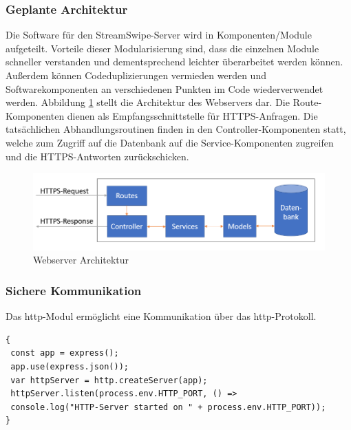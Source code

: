 \subsubsection{Geplante Architektur}
Die Software für den StreamSwipe-Server wird in Komponenten/Module aufgeteilt. Vorteile dieser Modularisierung sind, dass die einzelnen Module schneller verstanden und dementsprechend leichter überarbeitet werden können. Außerdem können Codeduplizierungen vermieden werden und Softwarekomponenten an verschiedenen Punkten im Code wiederverwendet werden. Abbildung \ref{fig:WebserverArchitektur} stellt die Architektur des Webservers dar. Die Route-Komponenten dienen als Empfangsschnittstelle für HTTPS-Anfragen. Die tatsächlichen Abhandlungsroutinen finden in den Controller-Komponenten statt, welche zum Zugriff auf die Datenbank auf die Service-Komponenten zugreifen und die HTTPS-Antworten zurückschicken.
\begin{figure}[tbt]
\centering

\includegraphics[width=13cm]{images/backendstruktur.PNG}
\caption{Webserver Architektur}
\label{fig:WebserverArchitektur}
\end{figure}

\subsubsection{Sichere Kommunikation}
\label{sec:SichereKommunikation}
Das http-Modul ermöglicht eine Kommunikation über das http-Protokoll.\\
 
\begin{lstlisting}[caption=Einfache Verbindung, label=lst:nodejs_easyconnection]
{
 const app = express();
 app.use(express.json()); 
 var httpServer = http.createServer(app);
 httpServer.listen(process.env.HTTP_PORT, () => 
 console.log("HTTP-Server started on " + process.env.HTTP_PORT));
}
\end{lstlisting}

